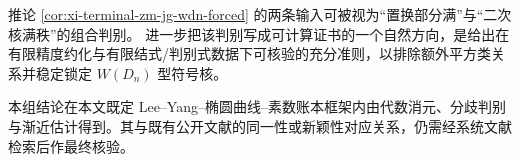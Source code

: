 \begin{remark}[可计算判别接口的自然目标]\label{rem:xi-terminal-zm-jg-effective-squareclass-test}
推论 \ref{cor:xi-terminal-zm-jg-wdn-forced} 的两条输入可被视为“置换部分满”与“二次核满秩”的组合判别。
进一步把该判别写成可计算证书的一个自然方向，是给出在有限精度约化与有限结式/判别式数据下可核验的充分准则，以排除额外平方类关系并稳定锁定 \(W(D_n)\) 型符号核。
\end{remark}



\begin{remark}[文献同一性核验范围]\label{rem:xi-terminal-zm-leyang-elliptic-prime-ledger-literature-scope}
本组结论在本文既定 Lee--Yang--椭圆曲线--素数账本框架内由代数消元、分歧判别与渐近估计得到。其与既有公开文献的同一性或新颖性对应关系，仍需经系统文献检索后作最终核验。
\end{remark}
